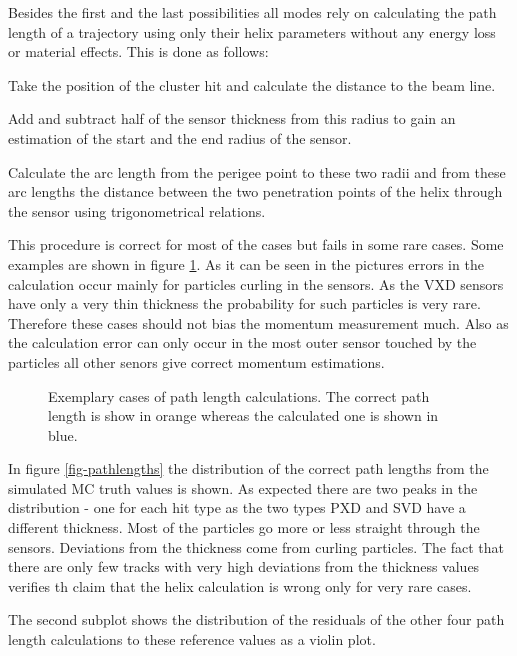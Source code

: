 Besides the first and the last possibilities all modes rely on calculating the path length of a trajectory using only their helix parameters without any energy loss or material effects. This is done as follows:
\begin{zlist}
 \item Take the position of the cluster hit and calculate the distance to the beam line.
 \item Add and subtract half of the sensor thickness from this radius to gain an estimation of the start and the end radius of the sensor.
 \item Calculate the arc length from the perigee point to these two radii and from these arc lengths the distance between the two penetration points of the helix through the sensor using trigonometrical relations.
\end{zlist}

This procedure is correct for most of the cases but fails in some rare cases. Some examples are shown in figure \ref{fig-errors-in-path-length}. As it can be seen in the pictures errors in the calculation occur mainly for particles curling in the sensors. As the VXD sensors have only a very thin thickness the probability for such particles is very rare. Therefore these cases should not bias the momentum measurement much. Also as the calculation error can only occur in the most outer sensor touched by the particles all other senors give correct momentum estimations.

\begin{figure}
  \centering
  \caption{Exemplary cases of path length calculations. The correct path length is show in orange whereas the calculated one is shown in blue.}
  \label{fig-errors-in-path-length}
\end{figure}

In figure \ref{fig-pathlengths} the distribution of the correct path lengths from the simulated MC truth values is shown. As expected there are two peaks in the distribution - one for each hit type as the two types PXD and SVD have a different thickness. Most of the particles go more or less straight through the sensors. Deviations from the thickness come from curling particles. The fact that there are only few tracks with very high deviations from the thickness values verifies th claim that the helix calculation is wrong only for very rare cases.

The second subplot shows the distribution of the residuals of the other four path length calculations to these reference values as a violin plot.


